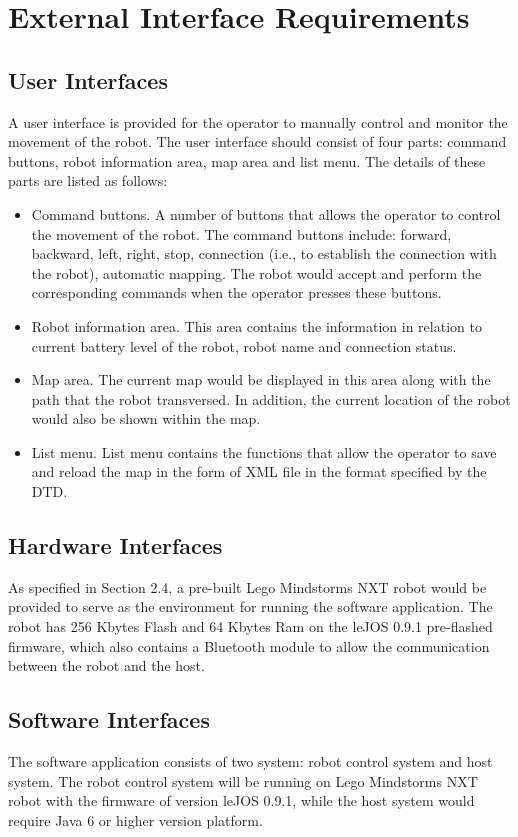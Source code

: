 \documentclass[titlepage]{article}
\begin{document}
\newpage




\section{External Interface Requirements}
\subsection{User Interfaces}
A user interface is provided for the operator to manually control and monitor the movement of the robot. The user interface should consist of four parts: command buttons, robot information area, map area and list menu. The details of these parts are listed as follows:
\begin{itemize}
\item Command buttons. A number of buttons that allows the operator to control the movement of the robot. The command buttons include: forward, backward, left, right, stop, connection (i.e., to establish the connection with the robot), automatic mapping. The robot would accept and perform the corresponding commands when the operator presses these buttons.
\item Robot information area. This area contains the information in relation to current battery level of the robot, robot name and connection status.
\item Map area. The current map would be displayed in this area along with the path that the robot transversed. In addition, the current location of the robot would also be shown within the map.
\item List menu. List menu contains the functions that allow the operator to save and reload the map in the form of XML file in the format specified by the DTD.
\end{itemize}
\subsection{Hardware Interfaces}
As specified in Section 2.4, a pre-built Lego Mindstorms NXT robot would be provided to serve as the environment for running the software application. The robot has 256 Kbytes Flash and 64 Kbytes Ram on the leJOS 0.9.1 pre-flashed firmware, which also contains a Bluetooth module to allow the communication between the robot and the host.
\subsection{Software Interfaces}
The software application consists of two system: robot control system and host system. The robot control system will be running on Lego Mindstorms NXT robot with the firmware of version leJOS 0.9.1, while the host system would require Java 6 or higher version platform.
\end{document}
